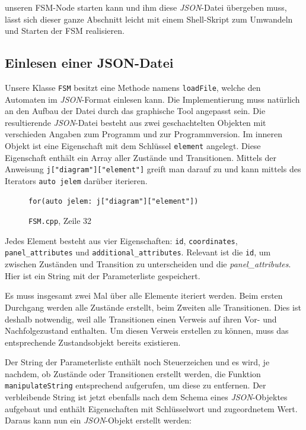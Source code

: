 unseren FSM-Node starten kann und ihm diese
\textit{JSON}-Datei übergeben muss, lässt sich dieser ganze Abschnitt leicht mit einem
Shell-Skript zum Umwandeln und Starten der FSM realisieren.


\subsection{Einlesen einer JSON-Datei}
Unsere Klasse \texttt{FSM} besitzt eine Methode namens \texttt{loadFile}, welche den Automaten
im \textit{JSON}-Format einlesen kann. Die Implementierung muss natürlich an den Aufbau
der Datei durch das graphische Tool angepasst sein. Die resultierende
\textit{JSON}-Datei besteht aus zwei geschachtelten Objekten mit verschieden Angaben zum
Programm und zur Programmversion. Im inneren Objekt ist eine Eigenschaft mit dem
Schlüssel \texttt{element} angelegt. Diese Eigenschaft enthält ein Array aller Zustände
und Transitionen.
Mittels der Anweisung \texttt{j["diagram"]["{}element"]} greift man
darauf zu und kann mittels des Iterators \texttt{auto jelem} darüber iterieren.

\begin{figure}[thp]
\begin{lstlisting}[style=json]
for(auto jelem: j["diagram"]["element"])

\end{lstlisting}
\centering
\caption{\texttt{FSM.cpp}, Zeile 32}
\end{figure}

Jedes Element besteht aus vier Eigenschaften: \texttt{id}, \texttt{coordinates},
\texttt{panel\_attributes} und \texttt{additional\_attributes}. Relevant ist die \texttt{id}, um
zwischen Zuständen und Transition zu unterscheiden und die \textit{panel\_attributes}.
Hier ist ein String mit der Parameterliste gespeichert.

Es muss insgesamt zwei Mal über alle Elemente iteriert werden. Beim ersten
Durchgang werden alle Zustände erstellt, beim Zweiten alle Transitionen. Dies
ist deshalb notwendig, weil alle Transitionen einen Verweis auf ihren Vor- und
Nachfolgezustand enthalten. Um diesen Verweis erstellen zu können, muss das
entsprechende Zustandsobjekt bereits existieren.

Der String der Parameterliste enthält noch Steuerzeichen und es wird, je
nachdem, ob Zustände oder Transitionen erstellt werden, die Funktion
\texttt{manipulateString} entsprechend aufgerufen, um diese zu entfernen. Der
verbleibende String ist jetzt ebenfalls nach dem Schema eines \textit{JSON}-Objektes
aufgebaut und enthält Eigenschaften mit Schlüsselwort und zugeordnetem Wert.
Daraus kann nun ein \textit{JSON}-Objekt erstellt werden:

